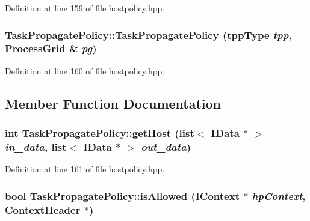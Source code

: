Definition at line 159 of file hostpolicy.hpp.\hypertarget{class_task_propagate_policy_afd45667da097ff87f11f8a63d396f5c6}{
\subsubsection[{TaskPropagatePolicy}]{\setlength{\rightskip}{0pt plus 5cm}TaskPropagatePolicy::TaskPropagatePolicy ({\bf tppType} {\em tpp}, \/  {\bf ProcessGrid} \& {\em pg})}}
\label{class_task_propagate_policy_afd45667da097ff87f11f8a63d396f5c6}


Definition at line 160 of file hostpolicy.hpp.

\subsection{Member Function Documentation}
\hypertarget{class_task_propagate_policy_a7fb05d7f6392bbe12c1d071d4dd529d7}{
\subsubsection[{getHost}]{\setlength{\rightskip}{0pt plus 5cm}int TaskPropagatePolicy::getHost (list$<$ {\bf IData} $\ast$ $>$ {\em in\_\-data}, \/  list$<$ {\bf IData} $\ast$ $>$ {\em out\_\-data})}}
\label{class_task_propagate_policy_a7fb05d7f6392bbe12c1d071d4dd529d7}


Definition at line 161 of file hostpolicy.hpp.\hypertarget{class_task_propagate_policy_a5dda297fceb4379ba92f8e2e0e899f2a}{
\subsubsection[{isAllowed}]{\setlength{\rightskip}{0pt plus 5cm}bool TaskPropagatePolicy::isAllowed ({\bf IContext} $\ast$ {\em hpContext}, \/  {\bf ContextHeader} $\ast$)}}
\label{class_task_propagate_policy_a5dda297fceb4379ba92f8e2e0e899f2a}


